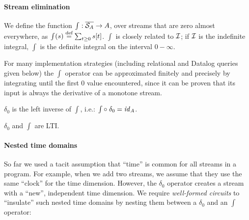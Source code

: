 \paragraph{Stream elimination}

We define the function $\int : \overline{\mathcal{S}_{A}} \rightarrow
A$, over streams that are zero almost everywhere, as 
$\int(s) \stackrel{\textrm{\scriptsize def}}{=} \sum_{t \geq 0} s[t]$.  
$\int$ is closely related to $\mathcal{I}$; if $\mathcal{I}$ is the
indefinite integral, $\int$ is the definite integral on the
interval $0 - \infty$.

For many implementation strategies (including  
relational and Datalog queries given below) the $\int$
operator can be approximated finitely and precisely by integrating until the
first 0 value encountered, since it can be proven that its input is always
the derivative of a monotone stream.

$\delta_0$ is the left inverse of $\int$, i.e.: $\int \circ \; \delta_0 = \mathit{id}_A$.  
\begin{proposition}
$\delta_0$ and $\int$ are LTI.
\end{proposition}

\paragraph{Nested time domains}

So far we used a tacit assumption that ``time'' is common for all
streams in a program.  For example, when we add two streams, 
we assume that they use the same ``clock'' for the time dimension.
However, the $\delta_0$ operator creates a stream with a ``new'', independent time
dimension.  We require \emph{well-formed circuits}
to ``insulate'' such
nested time domains by nesting them between a $\delta_0$ and an $\int$ operator:

\begin{center}
\end{center}

